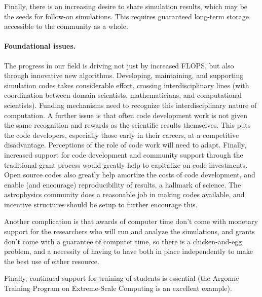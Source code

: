 \documentclass[11pt,twocolumn]{article}
\begin{document}
Finally, there is an increasing desire to share simulation results,
which may be the seeds for follow-on simulations.  This
requires guaranteed long-term storage accessible to the community as a
whole.

\paragraph*{Foundational issues.}

The progress in our field is driving not just by increased FLOPS, but
also through innovative new algorithms.  Developing, maintaining, and
supporting simulation codes takes considerable effort, crossing
interdisciplinary lines (with coordination between domain scientists,
mathematicians, and computational scientists).  Funding mechanisms
need to recognize this interdisciplinary nature of computation.  A
further issue is that often code development work is not given the
same recognition and rewards as the scientific results themselves.
This puts the code developers, especially those early in their
careers, at a competitive disadvantage.  Perceptions of the role of
code work will need to adapt.  Finally, increased support for code
development and community support through the traditional grant
process would greatly help to capitalize on code investments.  Open
source codes also greatly help amortize the costs of code development,
and enable (and encourage) reproducibility of results, a hallmark of
science.  The astrophysics community does a reasonable job in making
codes available, and incentive structures should be setup to further
encourage this.

Another complication is that awards of computer time don't come with
monetary support for the researchers who will run and analyze the
simulations, and grants don't come with a guarantee of computer time,
so there is a chicken-and-egg problem, and a necessity of having to
have both in place independently to make the best use of either
resource.

Finally, continued support for training of students is essential (the
Argonne Training Program on Extreme-Scale Computing is an excellent
example).
\end{document}
